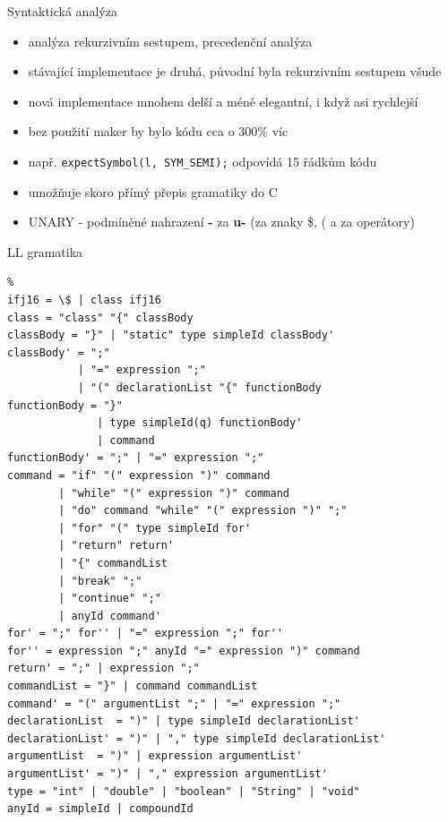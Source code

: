 \documentclass[13pt]{beamer}
\begin{document}
\begin{frame}{Syntaktická analýza}
  \begin{itemize}
  \item analýza rekurzivním sestupem, precedenční analýza
  \item stávající implementace je druhá, původní byla rekurzivním sestupem všude
  \item nová implementace mnohem delší a méně elegantní, i když asi rychlejší
  \item bez použití maker by bylo kódu cca o 300\% víc
  \item např. \texttt{expectSymbol(l, SYM\_SEMI);} odpovídá 15 řádkům kódu
  \item umožňuje skoro přímý přepis gramatiky do C
  \item UNARY - podmíněné nahrazení \textbf{-} za \textbf{u-} (za znaky \$, ( a za operátory)
  \end{itemize}
\end{frame}

\begin{frame}[fragile]{LL gramatika}
\begin{lrbox}{\grammarbox}%
    \begin{lstlisting}%
ifj16 = \$ | class ifj16
class = "class" "{" classBody
classBody = "}" | "static" type simpleId classBody'
classBody' = ";"
           | "=" expression ";"
           | "(" declarationList "{" functionBody
functionBody = "}"
              | type simpleId(q) functionBody'
              | command
functionBody' = ";" | "=" expression ";"
command = "if" "(" expression ")" command
        | "while" "(" expression ")" command
        | "do" command "while" "(" expression ")" ";"
        | "for" "(" type simpleId for'
        | "return" return'
        | "{" commandList
        | "break" ";"
        | "continue" ";"
        | anyId command'
for' = ";" for'' | "=" expression ";" for''
for'' = expression ";" anyId "=" expression ")" command
return' = ";" | expression ";"
commandList = "}" | command commandList
command' = "(" argumentList ";" | "=" expression ";"
declarationList  = ")" | type simpleId declarationList'
declarationList' = ")" | "," type simpleId declarationList'
argumentList  = ")" | expression argumentList'
argumentList' = ")" | "," expression argumentList'
type = "int" | "double" | "boolean" | "String" | "void"
anyId = simpleId | compoundId
    \end{lstlisting}%
\end{lrbox}%
\scalebox{0.52}{\usebox{\grammarbox}}
\end{frame}
\end{document}
